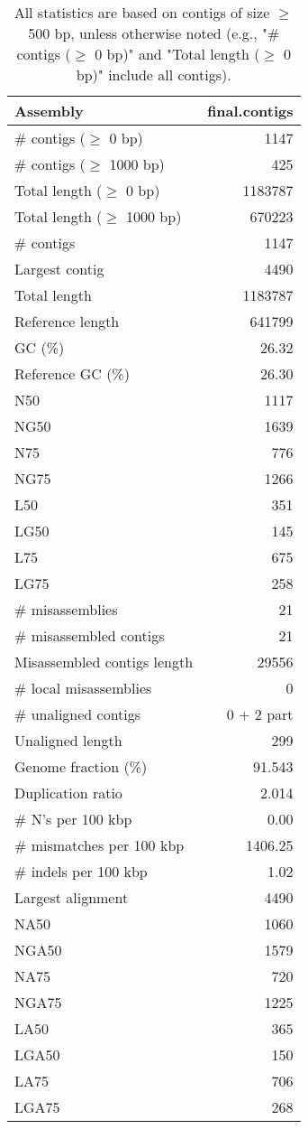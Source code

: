 \documentclass[12pt,a4paper]{article}
\begin{document}
\begin{table}[ht]
\begin{center}
\caption{All statistics are based on contigs of size $\geq$ 500 bp, unless otherwise noted (e.g., "\# contigs ($\geq$ 0 bp)" and "Total length ($\geq$ 0 bp)" include all contigs).}
\begin{tabular}{|l*{1}{|r}|}
\hline
Assembly & final.contigs \\ \hline
\# contigs ($\geq$ 0 bp) & 1147 \\ \hline
\# contigs ($\geq$ 1000 bp) & 425 \\ \hline
Total length ($\geq$ 0 bp) & 1183787 \\ \hline
Total length ($\geq$ 1000 bp) & 670223 \\ \hline
\# contigs & 1147 \\ \hline
Largest contig & 4490 \\ \hline
Total length & 1183787 \\ \hline
Reference length & 641799 \\ \hline
GC (\%) & 26.32 \\ \hline
Reference GC (\%) & 26.30 \\ \hline
N50 & 1117 \\ \hline
NG50 & 1639 \\ \hline
N75 & 776 \\ \hline
NG75 & 1266 \\ \hline
L50 & 351 \\ \hline
LG50 & 145 \\ \hline
L75 & 675 \\ \hline
LG75 & 258 \\ \hline
\# misassemblies & 21 \\ \hline
\# misassembled contigs & 21 \\ \hline
Misassembled contigs length & 29556 \\ \hline
\# local misassemblies & 0 \\ \hline
\# unaligned contigs & 0 + 2 part \\ \hline
Unaligned length & 299 \\ \hline
Genome fraction (\%) & 91.543 \\ \hline
Duplication ratio & 2.014 \\ \hline
\# N's per 100 kbp & 0.00 \\ \hline
\# mismatches per 100 kbp & 1406.25 \\ \hline
\# indels per 100 kbp & 1.02 \\ \hline
Largest alignment & 4490 \\ \hline
NA50 & 1060 \\ \hline
NGA50 & 1579 \\ \hline
NA75 & 720 \\ \hline
NGA75 & 1225 \\ \hline
LA50 & 365 \\ \hline
LGA50 & 150 \\ \hline
LA75 & 706 \\ \hline
LGA75 & 268 \\ \hline
\end{tabular}
\end{center}
\end{table}
\end{document}
